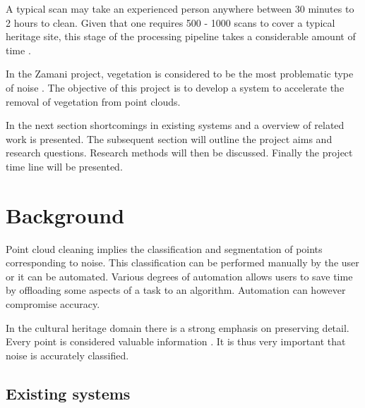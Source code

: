 \documentclass[10pt,twocolumn]{article}
\begin{document}
A typical scan may take an experienced person anywhere between 30 minutes to 2 hours to clean. Given that one requires 500 - 1000 scans to cover a typical heritage site, this stage of the processing pipeline takes a considerable amount of time \cite{Ruther2011}.

In the Zamani project, vegetation is considered to be the most problematic type of noise \cite{Held2012}. The objective of this project is to develop a system to accelerate the removal of vegetation from point clouds.

In the next section shortcomings in existing systems and a overview of related work is presented. The subsequent section will outline the project aims and research questions. Research methods will then be discussed. Finally the project time line will be presented.

\section{Background}

Point cloud cleaning implies the classification and segmentation of points corresponding to noise. This classification can be performed manually by the user or it can be automated. Various degrees of automation allows users to save time by offloading some aspects of a task to an algorithm. Automation can however compromise accuracy.

In the cultural heritage domain there is a strong emphasis on preserving detail. Every point is considered valuable information \cite{Held2012}. It is thus very important that noise is accurately classified.

\subsection{Existing systems}
\end{document}
